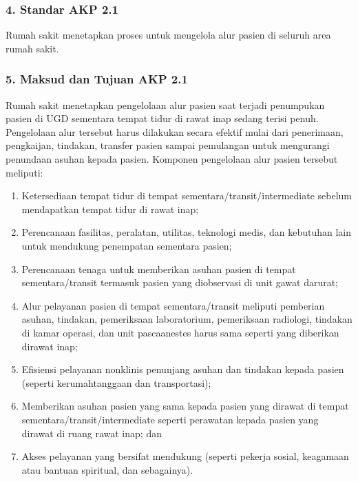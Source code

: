 \documentclass[
]{book}
\providecommand{\tightlist}{%
  \setlength{\itemsep}{0pt}\setlength{\parskip}{0pt}}
\begin{document}
\hypertarget{standar-akp-2.1}{%
\subsubsection*{4. Standar AKP 2.1}\label{standar-akp-2.1}}

Rumah sakit menetapkan proses untuk mengelola alur pasien di seluruh area rumah sakit.

\hypertarget{maksud-dan-tujuan-akp-2.1}{%
\subsubsection*{5. Maksud dan Tujuan AKP 2.1}\label{maksud-dan-tujuan-akp-2.1}}

Rumah sakit menetapkan pengelolaan alur pasien saat terjadi penumpukan pasien di UGD sementara tempat tidur di rawat inap sedang terisi penuh. Pengelolaan alur tersebut harus dilakukan secara efektif mulai dari penerimaan, pengkaijan, tindakan, transfer pasien sampai pemulangan untuk mengurangi penundaan asuhan kepada pasien. Komponen pengelolaan alur pasien tersebut meliputi:

\begin{enumerate}
\def\labelenumi{\alph{enumi}.}
\tightlist
\item
  Ketersediaan tempat tidur di tempat sementara/transit/intermediate sebelum mendapatkan tempat tidur di rawat inap;
\item
  Perencanaan fasilitas, peralatan, utilitas, teknologi medis, dan kebutuhan lain untuk mendukung penempatan sementara pasien;
\item
  Perencanaan tenaga untuk memberikan asuhan pasien di tempat sementara/transit termasuk pasien yang diobservasi di unit gawat darurat;
\item
  Alur pelayanan pasien di tempat sementara/transit meliputi pemberian asuhan, tindakan, pemeriksaan laboratorium, pemeriksaan radiologi, tindakan di kamar operasi, dan unit pascaanestes harus sama seperti yang diberikan dirawat inap;
\item
  Efisiensi pelayanan nonklinis penunjang asuhan dan tindakan kepada pasien (seperti kerumahtanggaan dan transportasi);
\item
  Memberikan asuhan pasien yang sama kepada pasien yang dirawat di tempat sementara/transit/intermediate seperti perawatan kepada pasien yang dirawat di ruang rawat inap; dan
\item
  Akses pelayanan yang bersifat mendukung (seperti pekerja sosial, keagamaan atau bantuan spiritual, dan sebagainya).
\end{enumerate}
\end{document}
